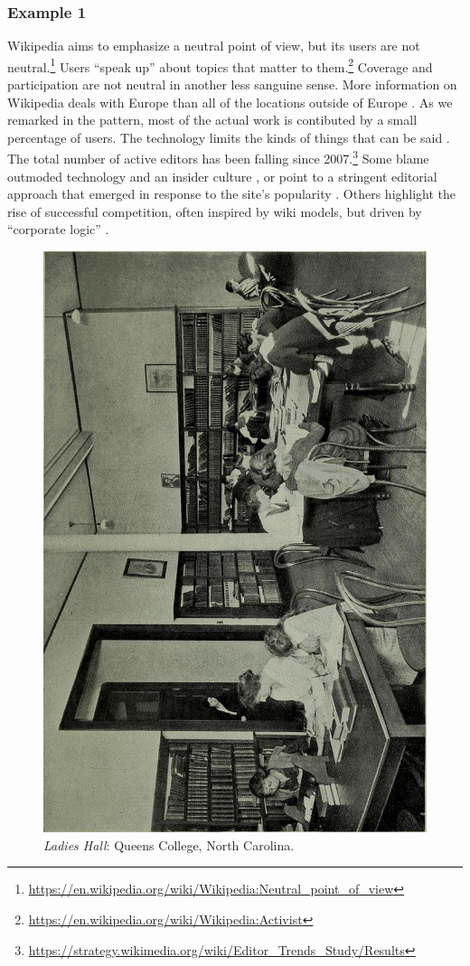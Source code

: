 

\subsubsection*{Example 1}
Wikipedia aims to emphasize a neutral point of view, but its users are
not neutral.\footnote{\url{https://en.wikipedia.org/wiki/Wikipedia:Neutral_point_of_view}}
Users ``speak up'' about topics that matter to them.\footnote{\url{https://en.wikipedia.org/wiki/Wikipedia:Activist}}
Coverage and participation are not neutral in another less sanguine sense.
More information on Wikipedia deals with Europe than
all of the locations outside of Europe \citep{graham2014uneven}.
As we remarked in the  pattern, most of the
actual work is contibuted by a small percentage of users.
%
The technology limits the kinds of things that can be said \cite{graham2014uneven}. 
%
The total number of active editors has been falling since
2007.\footnote{\url{https://strategy.wikimedia.org/wiki/Editor_Trends_Study/Results}}
Some blame outmoded technology and an insider culture
\cite{simonite2013decline}, or point to a stringent editorial
approach that emerged in response to the site's popularity
\cite{halfaker13rise}.  Others highlight the rise of successful competition, often inspired by wiki models, but driven by ``corporate logic'' \cite{kreiss2011limits,morellintroductory}.

\begingroup
\setlength{\columnsep}{5pt}%

\begin{figure}
\vspace{-.6cm}
\begin{center}
\includegraphics[width=.22\textwidth,angle=-90,trim=20 0 140 10, clip=true]{ladies-hall}
\end{center}
\vspace{-.5cm}
\captionsetup{font=footnotesize,width=.4\textwidth}
\caption{\textsl{Ladies Hall}: Queens College, North Carolina.
\label{ladies-hall}}
\vspace{-.5cm}
\end{figure}

